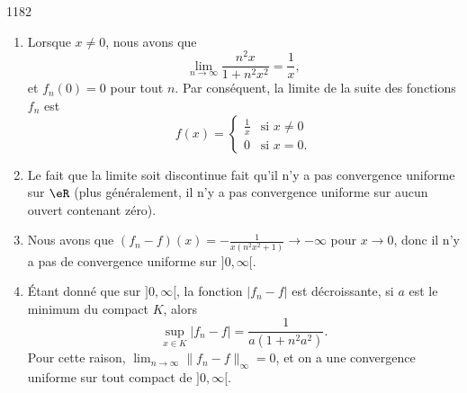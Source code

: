 

\begin{corrige}{1182}

\begin{enumerate}
\item Lorsque $x\neq 0$, nous avons que
\begin{equation}
	\lim_{n\to\infty}\frac{ n^2x }{ 1+n^2x^2 }=\frac{1}{ x },
\end{equation}
et $f_n(0)=0$ pour tout $n$. Par conséquent, la limite de la suite des fonctions $f_n$ est
\begin{equation}
	f(x)=
\begin{cases}
	\frac{1}{ x }	&	\text{si $x\neq 0$}\\
	0	&	 \text{si $x=0$}.
\end{cases}
\end{equation}
\item 
Le fait que la limite soit discontinue fait qu'il n'y a pas convergence uniforme sur $\eR$ (plus généralement, il n'y a pas convergence uniforme sur aucun ouvert contenant zéro).

\item Nous avons que $(f_n-f)(x)=-\frac{1}{ x(n^2x^2+1) }\to-\infty$ pour $x\to 0$, donc il n'y a pas de convergence uniforme sur $]0,\infty[$.

\item Étant donné que sur $]0,\infty[$, la fonction $| f_{n}-f |$ est décroissante, si $a$ est le minimum du compact $K$, alors
\begin{equation}
	\sup_{x\in K}| f_n-f |=\frac{ 1 }{ a(1+n^2a^2) }.
\end{equation}
Pour cette raison, $\lim_{n \to\infty}\| f_n-f \|_{\infty}=0$, et on a une convergence uniforme sur tout compact de $]0,\infty[$.
\end{enumerate}


\end{corrige}
